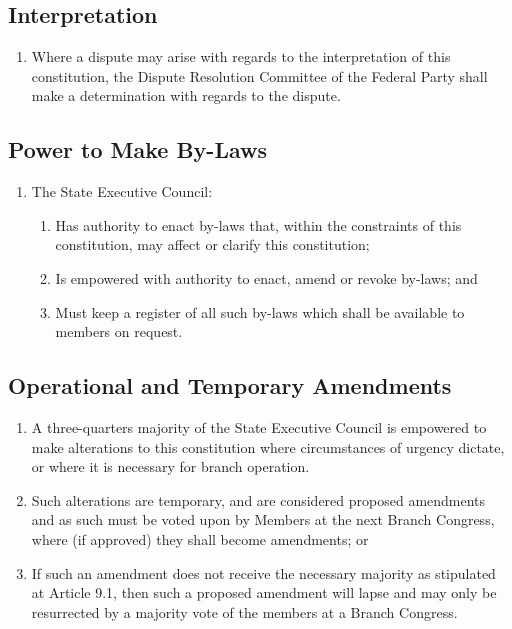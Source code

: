 \documentclass[a4paper,titlepage,8.5pt]{article}
\newcommand{\stateorterritory}{State}
\begin{document}
\subsection{Interpretation}

\begin{enumerate}
\item Where a dispute may arise with regards to the interpretation of this constitution, the Dispute Resolution Committee of the Federal Party shall make a determination with regards to the dispute.
\end{enumerate}

\subsection{Power to Make By-Laws}

\begin{enumerate}
\item The {\stateorterritory} Executive Council:
\begin{enumerate}
\item Has authority to enact by-laws that, within the constraints of this constitution, may affect or clarify this constitution;
\item Is empowered with authority to enact, amend or revoke by-laws; and
\item Must keep a register of all such by-laws which shall be available to members on request.
\end{enumerate}
\end{enumerate}

\subsection{Operational and Temporary Amendments}

\begin{enumerate}
\item A three-quarters majority of the {\stateorterritory} Executive Council is empowered to make alterations to this constitution where circumstances of urgency dictate, or where it is necessary for branch operation.
\item Such alterations are temporary, and are considered proposed amendments and as such must be voted upon by Members at the next Branch Congress, where (if approved) they shall become amendments; or
\item If such an amendment does not receive the necessary majority as stipulated at Article 9.1, then such a proposed amendment will lapse and may only be resurrected by a majority vote of the members at a Branch Congress.
\end{enumerate}
\end{document}
